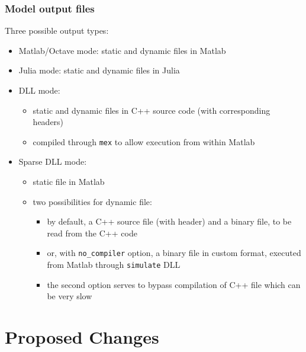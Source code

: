 \documentclass{beamer}
\begin{document}
\begin{frame}
  \frametitle{Model output files}
  Three possible output types:
  \begin{itemize}
  \item Matlab/Octave mode: static and dynamic files in Matlab
  \item Julia mode: static and dynamic files in Julia
  \item DLL mode:
    \begin{itemize}
    \item static and dynamic files in C++ source code (with corresponding headers)
    \item compiled through \texttt{mex} to allow execution from within Matlab
    \end{itemize}
  \item Sparse DLL mode:
    \begin{itemize}
    \item static file in Matlab
    \item two possibilities for dynamic file:
      \begin{itemize}
      \item by default, a C++ source file (with header) and a binary file, to be read from the C++ code
      \item or, with \texttt{no\_compiler} option, a binary file in custom format, executed from Matlab through \texttt{simulate} DLL
      \item the second option serves to bypass compilation of C++ file which can be very slow
      \end{itemize}
    \end{itemize}
  \end{itemize}
\end{frame}

\section{Proposed Changes}

\newcommand{\asuivre}{\setcounter{sauvegardeenumi}{\theenumi}}
\newcommand{\suite}{\setcounter{enumi}{\thesauvegardeenumi}}
\end{document}
